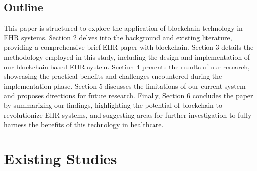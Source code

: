 \documentclass[12pt]{report}
\begin{document}
\subsection{Outline}
This paper is structured to explore the application of blockchain technology in EHR systems. Section 2 delves into the background and existing literature, providing a comprehensive brief  EHR paper with blockchain. Section 3 details the methodology employed in this study, including the design and implementation of our blockchain-based EHR system. Section 4 presents the results of our research, showcasing the practical benefits and challenges encountered during the implementation phase. Section 5 discusses the limitations of our current system and proposes directions for future research. Finally, Section 6 concludes the paper by summarizing our findings, highlighting the potential of blockchain to revolutionize EHR systems, and suggesting areas for further investigation to fully harness the benefits of this technology in healthcare.


\section{Existing Studies }
\end{document}
